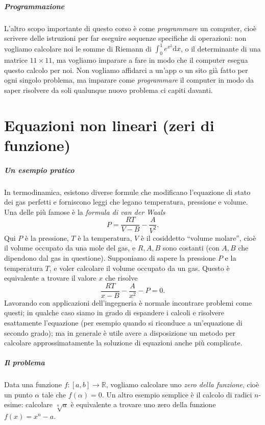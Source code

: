 \documentclass[a4paper]{report}
\theoremstyle{definiton}
\theoremstyle{remark}
\begin{document}
\paragraph{Programmazione} L'altro scopo importante di questo corso è come \emph{programmare} un computer, cioè scrivere delle istruzioni per far eseguire sequenze specifiche di operazioni: non vogliamo calcolare noi le somme di Riemann di $\int_0^1 e^{x^2} \mathrm{d}x$, o il determinante di una matrice $11\times 11$, ma vogliamo imparare a fare in modo che il computer esegua questo calcolo per noi. Non vogliamo affidarci a un'app o un sito già fatto per ogni singolo problema, ma imparare come \emph{programmare} il computer in modo da saper risolvere da soli qualunque nuovo problema ci capiti davanti.

\chapter{Equazioni non lineari (zeri di funzione)}


\paragraph{Un esempio pratico} In termodinamica, esistono diverse formule che modificano l'equazione di stato dei gas perfetti e forniscono leggi che legano temperatura, pressione e volume. Una delle più famose è la \emph{formula di van der Waals}
\[
    P = \frac{RT}{V-B} - \frac{A}{V^2}.
\]
Qui $P$ è la pressione, $T$ è la temperatura, $V$ è il cosiddetto ``volume molare'', cioè il volume occupato da una mole del gas, e $R,A,B$ sono costanti (con $A,B$ che dipendono dal gas in questione). Supponiamo di sapere la pressione $P$ e la temperatura $T$, e voler calcolare il volume occupato da un gas. Questo è equivalente a trovare il valore $x$ che risolve
\[
    \frac{RT}{x-B} - \frac{A}{x^2} - P = 0.
\]
Lavorando con applicazioni dell'ingegneria è normale incontrare problemi come questi; in qualche caso siamo in grado di espandere i calcoli e risolvere esattamente l'equazione (per esempio quando si riconduce a un'equazione di secondo grado); ma in generale è utile avere a disposizione un metodo per calcolare approssimatamente la soluzione di equazioni anche più complicate.

\paragraph{Il problema} Data una funzione $f: [a,b] \to \mathbb{R}$, vogliamo calcolare uno \emph{zero della funzione}, cioè un punto $\alpha$ tale che $f(\alpha) = 0$. Un altro esempio semplice è il calcolo di radici $n$-esime: calcolare $\sqrt[n]{a}$ è equivalente a trovare uno zero della funzione $f(x) = x^n - a$.
\end{document}
